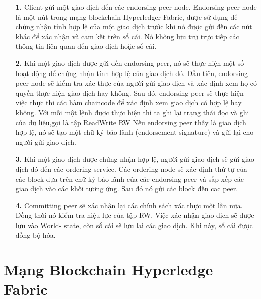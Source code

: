 \begin{itemize}
    \item[\textbf{1.}] Client gửi một giao dịch đến các endorsing peer node. Endorsing peer node là 
    một nút trong mạng blockchain Hyperledger Fabric, được sử dụng để chứng nhận tính hợp 
    lệ của một giao dịch trước khi nó được gửi đến các nút khác để xác nhận và cam kết trên 
    sổ cái. Nó không lưu trữ trực tiếp các thông tin liên quan đến giao dịch hoặc sổ cái.
    \item[\textbf{2.}] Khi một giao dịch được gửi đến endorsing peer, nó sẽ thực hiện một số hoạt 
    động để chứng nhận tính hợp lệ của giao dịch đó. Đầu tiên, endorsing peer node sẽ kiểm 
    tra xác thực của người gửi giao dịch và xác định xem họ có quyền thực hiện giao dịch hay 
    không. Sau đó, endorsing peer sẽ thực hiện việc thực thi các hàm chaincode để xác 
    định xem giao dịch có hợp lệ hay không. Với mỗi một lệnh được thực hiện thì ta ghi lại 
    trạng thái đọc và ghi của dữ liệu,gọi là tập ReadWrite RW
    Nếu endorsing peer thấy là giao dịch hợp lệ, nó sẽ tạo một chữ ký bảo lãnh (endorsement signature) và gửi lại cho người 
    gửi giao dịch. 
    \item[\textbf{3.}] Khi một giao dịch được chứng nhận hợp lệ, người gửi giao dịch sẽ gửi giao dịch
    đó đến các ordering service. Các ordering node sẽ xác định thứ tự của các block dựa trên 
    chữ ký bảo lãnh của các endorsing peer và sắp xếp các giao dịch vào các khối tương 
    ứng. Sau đó nó gửi các block đến cac peer.
    \item[\textbf{4.}] Committing peer sẽ xác nhận lại các chính sách xác thực một lần nữa. 
    Đồng thời nó kiểm tra hiệu lực của tập RW. Việc xác nhận giao dịch sẽ được lưu vào World- state, còn sổ cái sẽ lưu lại các giao dịch. Khi này, sổ cái được đồng bộ hóa.
\end{itemize}

\section{Mạng Blockchain Hyperledge Fabric}